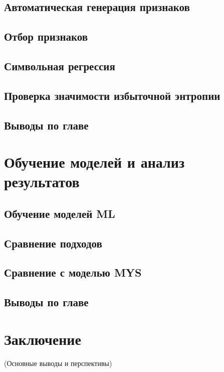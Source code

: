 \documentclass[a4paper,12pt]{article}
\begin{document}
  \subsection{Автоматическая генерация признаков}
  \subsection{Отбор признаков}
  \subsection{Символьная регрессия}
  \subsection{Проверка значимости избыточной энтропии}
  \subsection{Выводы по главе}
\newpage

\section{Обучение моделей и анализ результатов}
  \subsection{Обучение моделей ML}
  \subsection{Сравнение подходов}
  \subsection{Сравнение с моделью MYS}
  \subsection{Выводы по главе}
\newpage

\section*{Заключение}
(Основные выводы и перспективы)
\newpage

\end{document}
